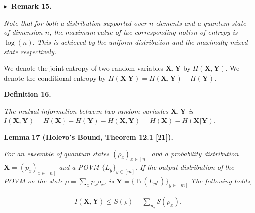 \par\medskip\noindent\textbf{
$\blacktriangleright$ Remark 15.
}\par



\emph{Note that for both a distribution supported over $n$ elements and a quantum state of dimension $n$, the maximum value of the corresponding notion of entropy is $\log(n)$. This is achieved by the uniform distribution and the maximally mixed state respectively.}\par






We denote the joint entropy of two random variables $\mathbf{X},\mathbf{Y}$ by $H(\mathbf{X},\mathbf{Y})$. We denote the conditional entropy by $H(\mathbf{X}|\mathbf{Y})=H(\mathbf{X},\mathbf{Y})-H(\mathbf{Y})$.\par





\par\medskip\noindent\textbf{
\textbf{Definition 16}\textbf{.}
}\par



\emph{The mutual information between two random variables $\mathbf{X},\mathbf{Y}$ is $I(\mathbf{X},\mathbf{Y})=H(\mathbf{X})+H(\mathbf{Y})-H(\mathbf{X},\mathbf{Y})=H(\mathbf{X})-H(\mathbf{X}|\mathbf{Y})$.}\par







\par\medskip\noindent\textbf{
\textbf{Lemma 17}\textbf{ }(Holevo’s Bound, Theorem 12.1 [21])\textbf{.}
}\par



\emph{For an ensemble of quantum states $(\rho_{x})_{x\in[n]}$ and a probability distribution $\mathbf{X}=(p_{x})_{x\in[n]}$ and a POVM $\{L_{y}\}_{y\in[m]}$. If the output distribution of the POVM on the state $\rho=\sum_{x}p_{x}\rho_{x}$, is $\mathbf{Y}=\{\mathrm{Tr}(L_{y}\rho)\}_{y\in[m]}$ The following holds,}\par


\[\begin{gathered}
I(\mathbf{X},\mathbf{Y})\leq S(\rho)-\sum_{p_{x}}S(\rho_{x}).
\end{gathered}\]



